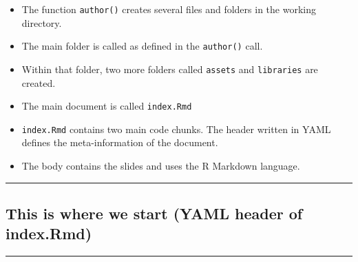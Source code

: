 \begin{itemize}
\item
  The function \texttt{author()} creates several files and folders in
  the working directory.
\item
  The main folder is called as defined in the \texttt{author()} call.
\item
  Within that folder, two more folders called \texttt{assets} and
  \texttt{libraries} are created.
\item
  The main document is called \texttt{index.Rmd}
\item
  \texttt{index.Rmd} contains two main code chunks. The header written
  in YAML defines the meta-information of the document.
\item
  The body contains the slides and uses the R Markdown language.
\end{itemize}

\begin{center}\rule{0.5\linewidth}{\linethickness}\end{center}

\subsection{This is where we start (YAML header of
index.Rmd)}\label{this-is-where-we-start-yaml-header-of-index.rmd}

\begin{Shaded}
\begin{Highlighting}[]
\NormalTok{---}
\StringTok{ }
\StringTok{ }
\StringTok{ }
\StringTok{ }
\StringTok{ }
\StringTok{ }
\StringTok{ }
\StringTok{ }
\StringTok{ }\NormalTok{[]}
\NormalTok{---}


\end{Highlighting}
\end{Shaded}

\begin{center}\rule{0.5\linewidth}{\linethickness}\end{center}

